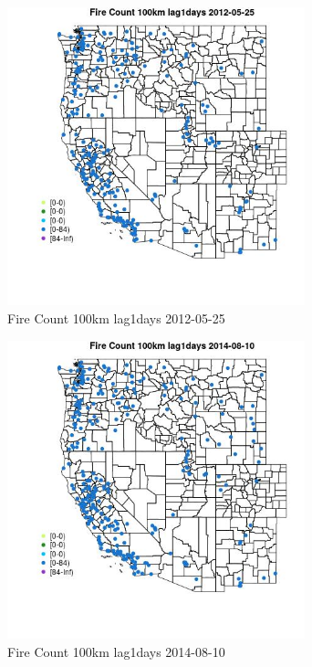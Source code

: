 \begin{figure} 
\centering  
\includegraphics[width=0.77\textwidth]{Code_Outputs/Report_ML_input_PM25_Step4_part_e_de_duplicated_aves_compiled_2019-05-18wNAs_MapObsFire_Count_100km_lag1days2012-05-25.jpg} 
\caption{\label{fig:Report_ML_input_PM25_Step4_part_e_de_duplicated_aves_compiled_2019-05-18wNAsMapObsFire_Count_100km_lag1days2012-05-25}Fire Count 100km lag1days 2012-05-25} 
\end{figure} 
 

\begin{figure} 
\centering  
\includegraphics[width=0.77\textwidth]{Code_Outputs/Report_ML_input_PM25_Step4_part_e_de_duplicated_aves_compiled_2019-05-18wNAs_MapObsFire_Count_100km_lag1days2014-08-10.jpg} 
\caption{\label{fig:Report_ML_input_PM25_Step4_part_e_de_duplicated_aves_compiled_2019-05-18wNAsMapObsFire_Count_100km_lag1days2014-08-10}Fire Count 100km lag1days 2014-08-10} 
\end{figure} 
 

